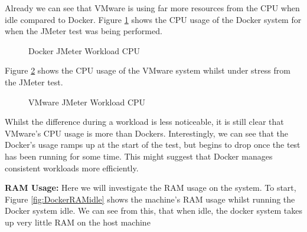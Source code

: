 Already we can see that VMware is using far more resources from the CPU when idle compared to Docker.
Figure \ref{fig:DockerCPUwork} shows the CPU usage of the Docker system for when the JMeter test was being performed.
\begin{figure}[H]
\caption{Docker JMeter Workload CPU}
\label{fig:DockerCPUwork}
\centering
\end{figure}

Figure \ref{fig:VMwareCPUwork} shows the CPU usage of the VMware system whilst under stress from the JMeter test.
\begin{figure}[H]
\caption{VMware JMeter Workload CPU}
\label{fig:VMwareCPUwork}
\centering
\end{figure}

Whilst the difference during a workload is less noticeable, it is still clear that VMware's CPU usage is more than Dockers. Interestingly, we can see that the Docker's usage ramps up at the start of the test, but begins to drop once the test has been running for some time. This might suggest that Docker manages consistent workloads more efficiently.

\textbf{RAM Usage:}
Here we will investigate the RAM usage on the system. To start, Figure \ref{fig:DockerRAMidle} shows the machine's RAM usage whilst running the Docker system idle. We can see from this, that when idle, the docker system takes up very little RAM on the host machine

